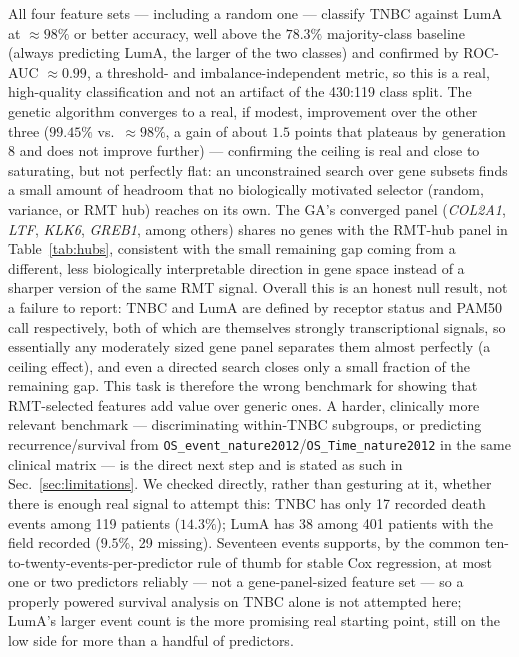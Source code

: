 \documentclass[11pt]{article}
\begin{document}
All four feature sets --- including a random one --- classify TNBC
against LumA at $\approx\!98\%$ or better accuracy, well above the
$78.3\%$ majority-class baseline (always predicting LumA, the larger
of the two classes) and confirmed by ROC-AUC $\approx\!0.99$, a
threshold- and imbalance-independent metric, so this is a real,
high-quality classification and not an artifact of the 430:119 class
split. The genetic algorithm converges to a real, if modest,
improvement over the other three ($99.45\%$ vs.\ $\approx\!98\%$, a
gain of about $1.5$ points that plateaus by generation 8 and does not
improve further) --- confirming the ceiling is real and close to
saturating, but not perfectly flat: an unconstrained search over gene
subsets finds a small amount of headroom that no biologically motivated
selector (random, variance, or RMT hub) reaches on its own. The GA's
converged panel (\emph{COL2A1}, \emph{LTF}, \emph{KLK6}, \emph{GREB1},
among others) shares no genes with the RMT-hub panel in
Table~\ref{tab:hubs}, consistent with the small remaining gap coming
from a different, less biologically interpretable direction in gene
space instead of a sharper version of the same RMT signal. Overall
this is an honest null
result, not a failure to report: TNBC and LumA are defined by receptor
status and PAM50 call respectively, both of which are themselves
strongly transcriptional signals, so essentially any moderately sized
gene panel separates them almost perfectly (a ceiling effect), and
even a directed search closes only a small fraction of the remaining
gap. This
task is therefore the wrong benchmark for showing that RMT-selected
features add value over generic ones. A harder,
clinically more relevant benchmark --- discriminating within-TNBC
subgroups, or predicting recurrence/survival from
\texttt{OS\_event\_nature2012}/\texttt{OS\_Time\_nature2012} in the
same clinical matrix --- is the direct next step and is stated as such
in Sec.~\ref{sec:limitations}. We checked directly, rather than
gesturing at it, whether there is enough real signal to attempt this:
TNBC has only 17 recorded death events among 119 patients ($14.3\%$);
LumA has 38 among 401 patients with the field recorded ($9.5\%$, 29
missing). Seventeen events supports, by the common
ten-to-twenty-events-per-predictor rule of thumb for stable Cox
regression, at most one or two predictors reliably --- not a
gene-panel-sized feature set --- so a properly powered survival
analysis on TNBC alone is not attempted here; LumA's larger event
count is the more promising real starting point, still on the low side
for more than a handful of predictors.
\end{document}
